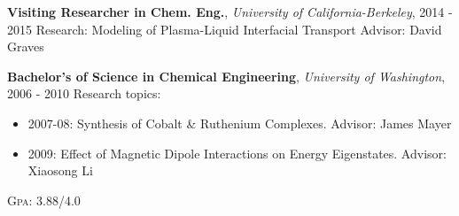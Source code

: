 \documentclass[a4paper,10pt]{article} %
\newcounter{magicrownumbers}
\begin{document}

\textbf{Visiting Researcher in Chem. Eng.}, \textit{University of California-Berkeley}, \textsc{2014 - 2015}\newline
\hspace*{0.5em}Research: Modeling of Plasma-Liquid Interfacial Transport\newline
\hspace*{0.5em}Advisor: David Graves\newline


\textbf{Bachelor's of Science in Chemical Engineering}, \textit{University of Washington}, \textsc{2006 - 2010}\newline
\hspace*{0.5em}Research topics:
\begin{itemize}[noitemsep, topsep=-\parskip, after={}]
\item 2007-08: Synthesis of Cobalt \& Ruthenium Complexes. \newline Advisor: James Mayer
\item 2009: Effect of Magnetic Dipole Interactions on Energy Eigenstates. \newline Advisor: Xiaosong Li
\end{itemize}
\hspace*{0.5em}\textsc{Gpa}: 3.88/4.0\newline






\setcounter{magicrownumbers}{0}




\end{document}
